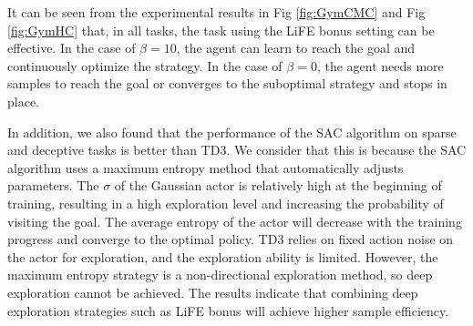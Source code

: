 It can be seen from the experimental results in Fig \ref{fig:GymCMC} and Fig \ref{fig:GymHC} that, in all tasks, the task using the LiFE bonus setting can be effective. In the case of $\beta = 10$, the agent can learn to reach the goal and continuously optimize the strategy. In the case of $\beta = 0$, the agent needs more samples to reach the goal or converges to the suboptimal strategy and stops in place.

In addition, we also found that the performance of the SAC algorithm on sparse and deceptive tasks is better than TD3. We consider that this is because the SAC algorithm uses a maximum entropy method that automatically adjusts parameters. The $\sigma$ of the Gaussian actor is relatively high at the beginning of training, resulting in a high exploration level and increasing the probability of visiting the goal. The average entropy of the actor will decrease with the training progress and converge to the optimal policy. TD3 relies on fixed action noise on the actor for exploration, and the exploration ability is limited. However, the maximum entropy strategy is a non-directional exploration method, so deep exploration cannot be achieved. The results indicate that combining deep exploration strategies such as LiFE bonus will achieve higher sample efficiency.